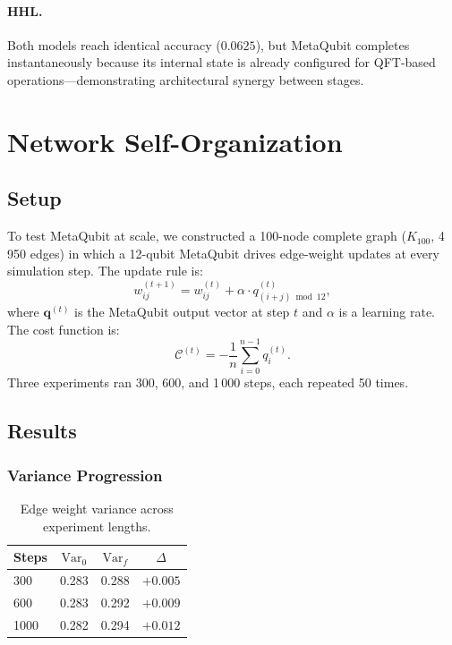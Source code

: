 \documentclass[twocolumn,amsmath,amssymb,prl]{revtex4-2}
\begin{document}
\paragraph{HHL.}  Both models reach identical accuracy ($0.0625$), but MetaQubit
completes instantaneously because its internal state is already configured for
QFT-based operations—demonstrating architectural synergy between stages.

\section{Network Self-Organization}
\label{sec:network}

\subsection{Setup}

To test MetaQubit at scale, we constructed a 100-node complete graph
($K_{100}$, 4\,950 edges) in which a 12-qubit MetaQubit drives edge-weight
updates at every simulation step.  The update rule is:
\begin{equation}
  w_{ij}^{(t+1)} = w_{ij}^{(t)} + \alpha \cdot q_{(i+j) \bmod 12}^{(t)},
\end{equation}
where $\mathbf{q}^{(t)}$ is the MetaQubit output vector at step $t$ and
$\alpha$ is a learning rate.  The cost function is:
\begin{equation}
  \mathcal{C}^{(t)} = -\frac{1}{n}\sum_{i=0}^{n-1} q_i^{(t)}.
\end{equation}
Three experiments ran 300, 600, and 1\,000 steps, each repeated 50 times.

\subsection{Results}

\subsubsection{Variance Progression}

\begin{table}[h]
\centering
\caption{Edge weight variance across experiment lengths.}
\label{tab:variance}
\begin{tabular}{lccc}
\toprule
Steps & $\mathrm{Var}_0$ & $\mathrm{Var}_f$ & $\Delta$ \\
\midrule
300  & 0.283 & 0.288 & $+0.005$ \\
600  & 0.283 & 0.292 & $+0.009$ \\
1000 & 0.282 & 0.294 & $+0.012$ \\
\bottomrule
\end{tabular}
\end{table}
\end{document}
